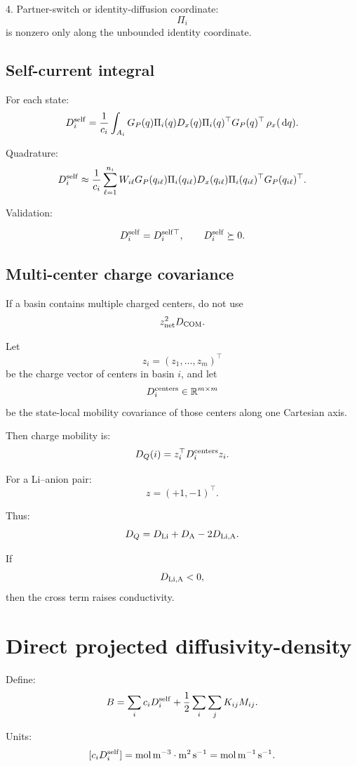 \documentclass[11pt]{article}
\newcommand{\dd}{\,\mathrm d}
\newcommand{\R}{\mathbb R}
\begin{document}
  4. Partner-switch or identity-diffusion coordinate:
  \[
  \Pi_i
  \]
  is nonzero only along the unbounded identity coordinate.

  \subsection{Self-current integral}

  For each state:
  \[
  D_i^{\rm self}
  =
  \frac{1}{c_i}
  \int_{A_i}
  G_P(q)
  \Pi_i(q)
  D_x(q)
  \Pi_i(q)^\top
  G_P(q)^\top
  \,\rho_x(\dd q).
  \]

  Quadrature:
  \[
  D_i^{\rm self}
  \approx
  \frac{1}{c_i}
  \sum_{\ell=1}^{n_i}
  W_{i\ell}
  G_P(q_{i\ell})
  \Pi_i(q_{i\ell})
  D_x(q_{i\ell})
  \Pi_i(q_{i\ell})^\top
  G_P(q_{i\ell})^\top.
  \]

  Validation:

  \[
  D_i^{\rm self}=D_i^{\rm self\top},
  \qquad
  D_i^{\rm self}\succeq0.
  \]

  \subsection{Multi-center charge covariance}

  If a basin contains multiple charged centers, do not use
  \[
  z_{\rm net}^2D_{\rm COM}.
  \]

  Let
  \[
  z_i=(z_1,\ldots,z_m)^\top
  \]
  be the charge vector of centers in basin \(i\), and let
  \[
  D_i^{\rm centers}\in\R^{m\times m}
  \]
  be the state-local mobility covariance of those centers along one Cartesian
  axis.

  Then charge mobility is:
  \[
  D_Q(i)=z_i^\top D_i^{\rm centers}z_i.
  \]

  For a Li--anion pair:
  \[
  z=(+1,-1)^\top.
  \]

  Thus:
  \[
  D_Q
  =
  D_{\rm Li}
  +
  D_{\rm A}
  -
  2D_{\rm Li,A}.
  \]

  If
  \[
  D_{\rm Li,A}<0,
  \]
  then the cross term raises conductivity.

  \section{Direct projected diffusivity-density}

  Define:
  \[
  B
  =
  \sum_i c_iD_i^{\rm self}
  +
  \frac{1}{2}\sum_i\sum_jK_{ij}M_{ij}.
  \]

  Units:
  \[
  [c_iD_i^{\rm self}]
  =
  \mathrm{mol\,m^{-3}}\cdot\mathrm{m^2\,s^{-1}}
  =
  \mathrm{mol\,m^{-1}\,s^{-1}}.
  \]
\end{document}
